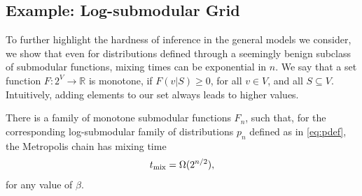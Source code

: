 \subsection{Example: Log-submodular Grid}
To further highlight the hardness of inference in the general models we consider, we show that even for distributions defined through a seemingly benign subclass of submodular functions, mixing times can be exponential in $n$.
We say that a set function $F : 2^V \to \mathbb{R}$ is monotone, if $F(v|S) \geq 0$, for all $v \in V$, and all $S \subseteq V$.
Intuitively, adding elements to our set always leads to higher values.
\begin{lemma}
There is a family of monotone submodular functions $F_n$, such that, for the corresponding log-submodular family of distributions $p_n$ defined as in \eqref{eq:pdef}, the Metropolis chain has mixing time
\begin{align*}
  t_{\mathrm{mix}}  = \Omega(2^{n/2}),
\end{align*}
for any value of $\beta$.
\end{lemma}


